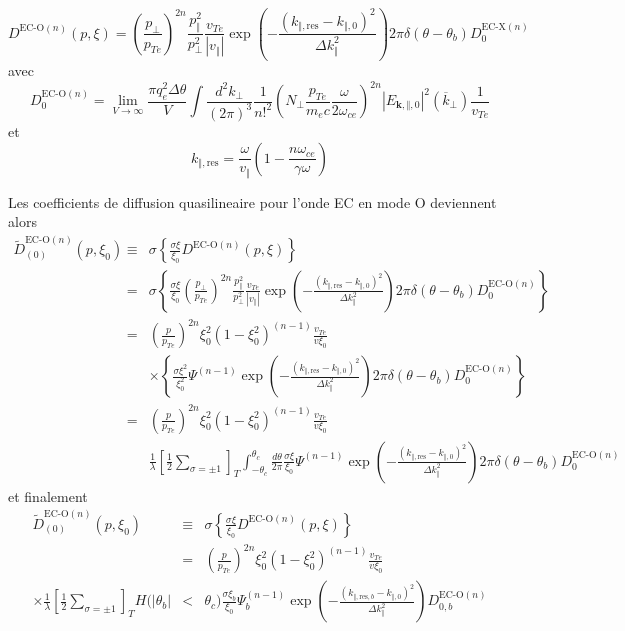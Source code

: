 \[
D^{\text{EC-O}(n)}(p,\xi)=\left(\frac{p_{\bot}}{p_{Te}}\right)^{2n}\frac{p_{\Vert}^{2}}{p_{\bot}^{2}}\frac{v_{Te}}{\left|v_{\Vert}\right|}\exp\left(-\frac{\left(k_{\Vert,\text{res}}-k_{\Vert,0}\right)^{2}}{\Delta k_{\Vert}^{2}}\right)2\pi\delta(\theta-\theta_{b})D_{0}^{\text{EC-X}(n)}\]
 avec \[
D_{0}^{\text{EC-O}(n)}=\lim_{V\rightarrow\infty}\frac{\pi q_{e}^{2}\Delta\theta}{V}\int\frac{d^{2}k_{\bot}}{(2\pi)^{3}}\frac{1}{n!^{2}}\left(N_{\bot}\frac{p_{Te}}{m_{e}c}\frac{\omega}{2\omega_{ce}}\right)^{2n}\left|E_{\mathbf{k},\Vert,0}\right|^{2}(\overline{k}_{\bot})\frac{1}{v_{Te}}\]
 et \[
k_{\Vert,\text{res}}=\frac{\omega}{v_{\Vert}}\left(1-\frac{n\omega_{ce}}{\gamma\omega}\right)\]


Les coefficients de diffusion quasilineaire pour l'onde EC en mode
O deviennent alors \begin{eqnarray*}
\widetilde{D}_{(0)}^{\text{EC-O}(n)}(p,\xi_{0}) & \equiv & \sigma\left\{ \frac{\sigma\xi}{\xi_{0}}D^{\text{EC-O}(n)}(p,\xi)\right\} \\
 & = & \sigma\left\{ \frac{\sigma\xi}{\xi_{0}}\left(\frac{p_{\bot}}{p_{Te}}\right)^{2n}\frac{p_{\Vert}^{2}}{p_{\bot}^{2}}\frac{v_{Te}}{\left|v_{\Vert}\right|}\exp\left(-\frac{\left(k_{\Vert,\text{res}}-k_{\Vert,0}\right)^{2}}{\Delta k_{\Vert}^{2}}\right)2\pi\delta(\theta-\theta_{b})D_{0}^{\text{EC-O}(n)}\right\} \\
 & = & \left(\frac{p}{p_{Te}}\right)^{2n}\xi_{0}^{2}\left(1-\xi_{0}^{2}\right)^{(n-1)}\frac{v_{Te}}{v\xi_{0}}\\
 &  & \times\left\{ \frac{\sigma\xi^{2}}{\xi_{0}^{2}}\Psi^{(n-1)}\exp\left(-\frac{\left(k_{\Vert,\text{res}}-k_{\Vert,0}\right)^{2}}{\Delta k_{\Vert}^{2}}\right)2\pi\delta(\theta-\theta_{b})D_{0}^{\text{EC-O}(n)}\right\} \\
 & = & \left(\frac{p}{p_{Te}}\right)^{2n}\xi_{0}^{2}\left(1-\xi_{0}^{2}\right)^{(n-1)}\frac{v_{Te}}{v\xi_{0}}\\
 &  & \frac{1}{\lambda}\left[\frac{1}{2}\sum_{\sigma=\pm1}\right]_{T}\int_{-\theta_{c}}^{\theta_{c}}\frac{d\theta}{2\pi}\frac{\sigma\xi}{\xi_{0}}\Psi^{(n-1)}\exp\left(-\frac{\left(k_{\Vert,\text{res}}-k_{\Vert,0}\right)^{2}}{\Delta k_{\Vert}^{2}}\right)2\pi\delta(\theta-\theta_{b})D_{0}^{\text{EC-O}(n)}\end{eqnarray*}
 et finalement \begin{eqnarray*}
\widetilde{D}_{(0)}^{\text{EC-O}(n)}(p,\xi_{0}) & \equiv & \sigma\left\{ \frac{\sigma\xi}{\xi_{0}}D^{\text{EC-O}(n)}(p,\xi)\right\} \\
 & = & \left(\frac{p}{p_{Te}}\right)^{2n}\xi_{0}^{2}\left(1-\xi_{0}^{2}\right)^{(n-1)}\frac{v_{Te}}{v\xi_{0}}\\
\times\frac{1}{\lambda}\left[\frac{1}{2}\sum_{\sigma=\pm1}\right]_{T}H(|\theta_{b}| & < & \theta_{c})\frac{\sigma\xi_{b}}{\xi_{0}}\Psi_{b}^{(n-1)}\exp\left(-\frac{\left(k_{\Vert,\text{res},b}-k_{\Vert,0}\right)^{2}}{\Delta k_{\Vert}^{2}}\right)D_{0,b}^{\text{EC-O}(n)}\end{eqnarray*}
